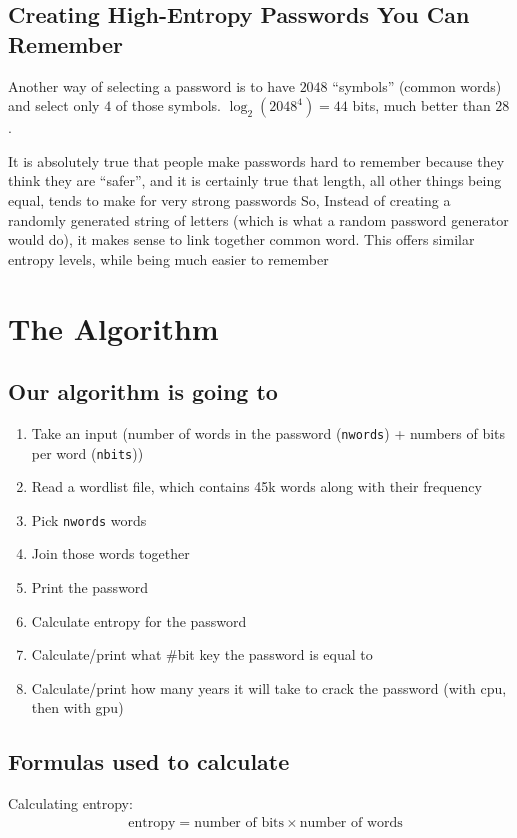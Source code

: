 \documentclass{scrartcl}
\begin{document}
\subsection{Creating High-Entropy Passwords You Can Remember}
\label{sec:orga20097b}
Another way of selecting a password is to have \(2048\) ``symbols'' (common words) and
select only \(4\) of those symbols. \(\log_{2}(2048^{4})=44\) bits, much better than \(28\).

It is absolutely true that people make passwords hard to remember because they
think they are ``safer'', and it is certainly true that length, all other things
being equal, tends to make for very strong passwords So, Instead of creating a
randomly generated string of letters (which is what a random password generator
would do), it makes sense to link together common word. This offers similar
entropy levels, while being much easier to remember

\section{The Algorithm}
\label{sec:org227820a}
\subsection{Our algorithm is going to}
\label{sec:orge100961}
\begin{enumerate}
\item Take an input (number of words in the password (\texttt{nwords}) + numbers of bits per
word (\texttt{nbits}))
\item Read a wordlist file, which contains 45k words along with their frequency
\item Pick \texttt{nwords} words
\item Join those words together
\item Print the password
\item Calculate entropy for the password
\item Calculate/print what \#bit key the password is equal to
\item Calculate/print how many years it will take to crack the password (with cpu,
then with gpu)
\end{enumerate}

\subsection{Formulas used to calculate}
\label{sec:org9d966bf}
Calculating entropy:
\begin{align*}
&\text{entropy}=\text{number of bits}\times\text{number of words}
\end{align*}
\end{document}
